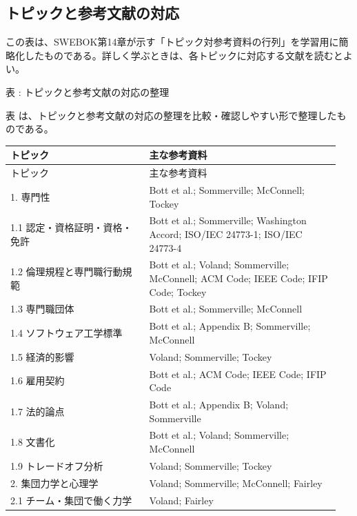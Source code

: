 \subsection*{トピックと参考文献の対応}


この表は、SWEBOK第14章が示す「トピック対参考資料の行列」を学習用に簡略化したものである。詳しく学ぶときは、各トピックに対応する文献を読むとよい。

\begin{center}
\small
\par\smallskip\noindent{}\label{tab:ch14-05}表 \thetable: トピックと参考文献の対応の整理\par\smallskip
表 \thetable は、トピックと参考文献の対応の整理を比較・確認しやすい形で整理したものである。\par\smallskip
\begin{longtable}{p{0.40\linewidth}p{0.55\linewidth}}
\toprule
トピック & 主な参考資料 \\
\midrule
\endfirsthead
\toprule
トピック & 主な参考資料 \\
\midrule
\endhead
1. 専門性 & Bott et al.; Sommerville; McConnell; Tockey \\
\midrule
1.1 認定・資格証明・資格・免許 & Bott et al.; Sommerville; Washington Accord; ISO/IEC 24773-1; ISO/IEC 24773-4 \\
\midrule
1.2 倫理規程と専門職行動規範 & Bott et al.; Voland; Sommerville; McConnell; ACM Code; IEEE Code; IFIP Code; Tockey \\
\midrule
1.3 専門職団体 & Bott et al.; Sommerville; McConnell \\
\midrule
1.4 ソフトウェア工学標準 & Bott et al.; Appendix B; Sommerville; McConnell \\
\midrule
1.5 経済的影響 & Voland; Sommerville; Tockey \\
\midrule
1.6 雇用契約 & Bott et al.; ACM Code; IEEE Code; IFIP Code \\
\midrule
1.7 法的論点 & Bott et al.; Appendix B; Voland; Sommerville \\
\midrule
1.8 文書化 & Bott et al.; Voland; Sommerville; McConnell \\
\midrule
1.9 トレードオフ分析 & Voland; Sommerville; Tockey \\
\midrule
2. 集団力学と心理学 & Voland; Sommerville; McConnell; Fairley \\
\midrule
2.1 チーム・集団で働く力学 & Voland; Fairley \\

\end{longtable}
\end{center}

